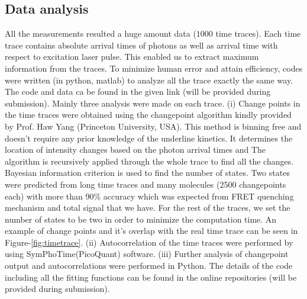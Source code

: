 \documentclass[journal=jacsat,manuscript=article]{achemso}
\begin{document}
\subsection{Data analysis}
All the measurements resulted a huge amount data ($1000$ time traces). Each time trace contains absolute arrival times of photons as well as arrival time with respect to excitation laser pulse. This enabled us to extract maximum information from the traces. To minimize human error and attain efficiency, codes were written (in python, matlab) to analyze all the trace exactly the same way. The code and data ca be found in the given link (will be provided during submission). Mainly three analysis were made on each trace. (i) Change points in the time traces were obtained using the changepoint algorithm\cite{watkins2005detection} kindly provided by Prof. Haw Yang (Princeton University, USA). This method is binning free and doesn't require any prior knowledge of the underline kinetics. It determines the location of intensity changes based on the photon arrival times and The algorithm is recursively applied through the whole trace to find all the changes. Bayesian information criterion is used to find the number of states. Two states were predicted from long time traces and many molecules (2500 changepoints each) with more than 90\% accuracy which was expected from FRET quenching mechanism and total signal that we have. For the rest of the traces, we set the number of states to be two in order to minimize the computation time. An example of change points and it's overlap with the real time trace can be seen in Figure-\ref{fig:timetrace}. (ii) Autocorrelation of the time traces were performed by using SymPhoTime(PicoQuant) software. (iii) Further analysis of changepoint output and autocorrelations were performed in Python. The details of the code including all the fitting functions can be found in the online repositories (will be provided during submission).
\end{document}
